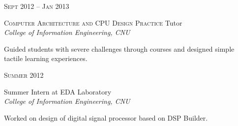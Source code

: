 \documentclass[10pt]{article} %
\begin{document}
\begin{minipage}[t]{0.44\textwidth}


{\raggedleft\textsc{Sept 2012 -- Jan 2013}\par}

{\raggedright \small\textsc{Computer Architecture and CPU Design Practice} Tutor\\
\textit{College of Information Engineering, CNU}\\}

\normalsize{Guided students with severe challenges through courses and designed simple tactile learning experiences.
}\\

{\raggedleft\textsc{Summer 2012}\par}

{\raggedright \small Summer Intern at EDA Laboratory\\
\textit{College of Information Engineering, CNU}\\}

\normalsize{
Worked on design of digital signal processor based on DSP Builder.
}\\

%






	
\end{minipage} %
\end{document}
